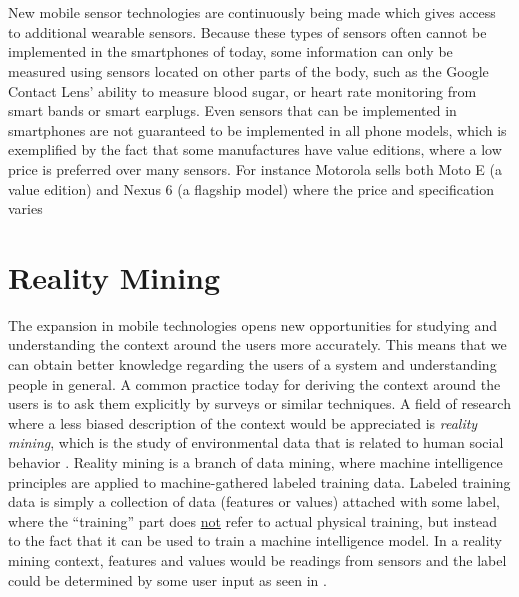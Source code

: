 \\\\
New mobile sensor technologies are continuously being made which gives access to additional wearable sensors. Because these types of sensors often cannot be implemented in the smartphones of today, some information can only be measured using sensors located on other parts of the body, such as the Google Contact Lens' ability to measure blood sugar, or heart rate monitoring from smart bands or smart earplugs. Even sensors that can be implemented in smartphones are not guaranteed to be implemented in all phone models, which is exemplified by the fact that some manufactures have value editions, where a low price is preferred over many sensors. For instance Motorola sells both Moto E (a value edition) and Nexus 6 (a flagship model) where the price and specification varies \parencite{moto_e_compared_to_nexus_6}

\section{Reality Mining}
\label{sec:reality_mining}
The expansion in mobile technologies opens new opportunities for studying and understanding the context around the users more accurately. This means that we can obtain better knowledge regarding the users of a system and understanding people in general. A common practice today for deriving the context around the users is to ask them explicitly by surveys or similar techniques. A field of research where a less biased description of the context would be appreciated is \emph{reality mining}, which is the study of environmental data that is related to human social behavior \parencite{madan2009_reality_mining_privacy}. Reality mining is a branch of data mining, where machine intelligence principles are applied to machine-gathered labeled training data. Labeled training data is simply a collection of data (features or values) attached with some label, where the ``training'' part does \underline{not} refer to actual physical training, but instead to the fact that it can be used to train a machine intelligence model. In a reality mining context, features and values would be readings from sensors and the label could be determined by some user input as seen in .

